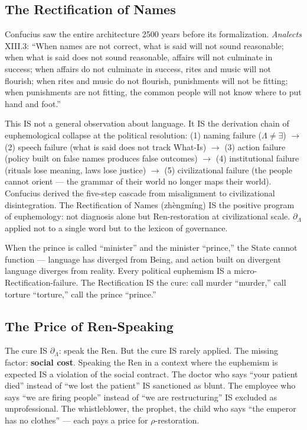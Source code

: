\documentclass[11pt, oneside]{article}
\theoremstyle{definition}
\begin{document}
\subsection{The Rectification of Names}

Confucius \cite{confucius} saw the entire architecture 2500 years before its formalization. \textit{Analects} XIII.3: ``When names are not correct, what is said will not sound reasonable; when what is said does not sound reasonable, affairs will not culminate in success; when affairs do not culminate in success, rites and music will not flourish; when rites and music do not flourish, punishments will not be fitting; when punishments are not fitting, the common people will not know where to put hand and foot.''

This IS not a general observation about language. It IS the derivation chain of euphemological collapse at the political resolution: (1) naming failure ($\Lambda \neq \exists$) $\to$ (2) speech failure (what is said does not track What-Is) $\to$ (3) action failure (policy built on false names produces false outcomes) $\to$ (4) institutional failure (rituals lose meaning, laws lose justice) $\to$ (5) civilizational failure (the people cannot orient --- the grammar of their world no longer maps their world). Confucius derived the five-step cascade from misalignment to civilizational disintegration. The Rectification of Names (zh\`{e}ngm\'{i}ng) IS the positive program of euphemology: not diagnosis alone but Ren-restoration at civilizational scale. $\partial_\Lambda$ applied not to a single word but to the lexicon of governance.

When the prince is called ``minister'' and the minister ``prince,'' the State cannot function --- language has diverged from Being, and action built on divergent language diverges from reality. Every political euphemism IS a micro-Rectification-failure. The Rectification IS the cure: call murder ``murder,'' call torture ``torture,'' call the prince ``prince.''

\subsection{The Price of Ren-Speaking}

The cure IS $\partial_\Lambda$: speak the Ren. But the cure IS rarely applied. The missing factor: \textbf{social cost}. Speaking the Ren in a context where the euphemism is expected IS a violation of the social contract. The doctor who says ``your patient died'' instead of ``we lost the patient'' IS sanctioned as blunt. The employee who says ``we are firing people'' instead of ``we are restructuring'' IS excluded as unprofessional. The whistleblower, the prophet, the child who says ``the emperor has no clothes'' --- each pays a price for $\rho$-restoration.
\end{document}
